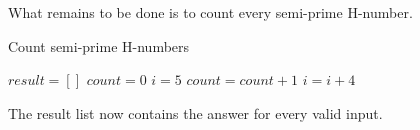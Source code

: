 \documentclass[11pt,a4paper,twoside]{article}
\begin{document}
What remains to be done is to count every semi-prime H-number.

\begin{algorithm}
    \caption{Count semi-prime H-numbers}
    \label{Count semi-prime H-numbers}
    \begin{algorithmic}
        \STATE $result = []$
        \STATE $count = 0$
        \STATE $i = 5$
                \STATE $count = count + 1$
            \ENDIF
            \STATE $i = i + 4$
        \ENDWHILE
    \end{algorithmic}
\end{algorithm}

The result list now contains the answer for every valid input.

\end{document}
